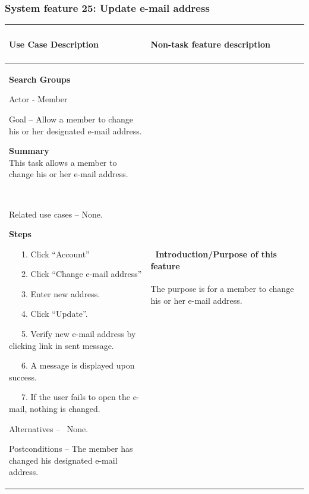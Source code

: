 \documentclass[letterpaper]{article}
\newcommand\textstyleDefaultParagraphFont[1]{#1}
\begin{document}
\subsubsection[System feature 25: Update e{}-mail address]{\rmfamily
System feature 25: Update e-mail address}
\begin{flushleft}
\tablehead{}
\begin{supertabular}{|m{3.17056in}|m{3.1712599in}|}
\hline
\bfseries\color{black} Use Case Description &
\paragraph[Non{}-task feature
description]{\rmfamily Non-task feature
description}
\\\hline
{\bfseries\color{black} Search Groups}

{\color{black} Actor - Member}

{\color{black} Goal -- Allow a member to change his or her designated
e-mail address.}

{\color{black}
\textstyleDefaultParagraphFont{\textbf{Summary}}\textstyleDefaultParagraphFont{\textbf{\ \ }}\newline
\textstyleDefaultParagraphFont{This task allows a member to change his
or her e-mail address.}}

~

{\color{black} Related use cases -- None.}

{\color{black} \textstyleDefaultParagraphFont{\textbf{Steps}}}

{\color{black} \ \ \ 1. Click
{\textquotedblleft}Account{\textquotedblright} }

{\color{black} \ \ \ 2. Click {\textquotedblleft}Change e-mail
address{\textquotedblright}}

{\color{black} \ \ \ 3. Enter new address.}

{\color{black} \ \ \ 4. Click
{\textquotedblleft}Update{\textquotedblright}.}

{\color{black} \ \ \ 5. Verify new e-mail address by clicking link in
sent message.}

{\color{black} \ \ \ 6. A message is displayed upon success.}

{\color{black} \ \ \ 7. If the user fails to open the e-mail, nothing is
changed.}

{\color{black} Alternatives -- \ None.}

\color{black} Postconditions -- The member has changed his designated
e-mail address. &
\paragraph[\ Introduction/Purpose of this
feature]{\rmfamily \ Introduction/Purpose of
this feature}
{\color{black} The purpose is for a member to change his or her e-mail
address.}


\end{supertabular}
\end{flushleft}
\end{document}
